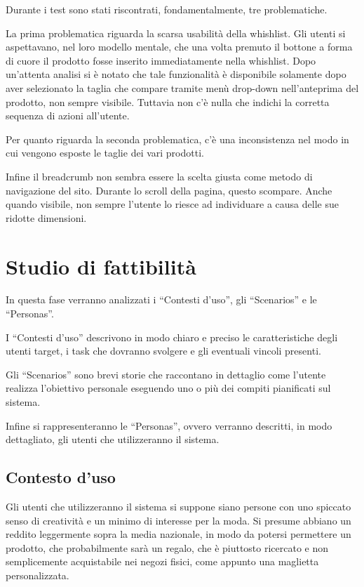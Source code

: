 \documentclass[12pt,italian,]{report}
\begin{document}
Durante i test sono stati riscontrati, fondamentalmente, tre problematiche.

La prima problematica riguarda la scarsa usabilità della whishlist. Gli utenti si aspettavano, nel loro modello mentale, che una volta premuto il bottone a forma di cuore il prodotto fosse inserito immediatamente nella whishlist. Dopo un'attenta analisi si è notato che tale funzionalità è disponibile solamente dopo aver selezionato la taglia che compare tramite menù drop-down nell'anteprima del prodotto, non sempre visibile. Tuttavia non c'è nulla che indichi la corretta sequenza di azioni all'utente.

Per quanto riguarda la seconda problematica, c'è una inconsistenza nel modo in cui vengono esposte le taglie dei vari prodotti.

Infine il breadcrumb non sembra essere la scelta giusta come metodo di navigazione del sito. Durante lo scroll della pagina, questo scompare. Anche quando visibile, non sempre l'utente lo riesce ad individuare a causa delle sue ridotte dimensioni.

\chapter{Studio di fattibilità}\label{studio-di-fattibilituxe0}

In questa fase verranno analizzati i ``Contesti d'uso'', gli
``Scenarios'' e le ``Personas''.

I ``Contesti d'uso'' descrivono in modo chiaro e preciso le
caratteristiche degli utenti target, i task che dovranno svolgere e
gli eventuali vincoli presenti.

Gli ``Scenarios'' sono brevi storie che raccontano in dettaglio come
l'utente realizza l'obiettivo personale eseguendo uno o più dei compiti
pianificati sul sistema.

Infine si rappresenteranno le ``Personas'', ovvero verranno descritti,
in modo dettagliato, gli utenti che utilizzeranno il sistema.

\hypertarget{contesto-duso}{%
\section{Contesto d'uso}\label{contesto-duso}}

Gli utenti che utilizzeranno il sistema si suppone siano persone con uno spiccato senso di creatività e un minimo di interesse per la moda. Si presume abbiano un reddito leggermente sopra la media nazionale, in modo da potersi permettere un prodotto, che probabilmente sarà un regalo, che è piuttosto ricercato e non semplicemente acquistabile nei negozi fisici, come appunto una maglietta personalizzata.
\end{document}
